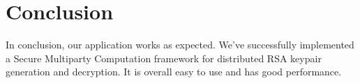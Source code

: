 \chapter{Conclusion}

  In conclusion, our application works as expected. We’ve successfully implemented a Secure  Multiparty Computation framework for distributed RSA keypair generation and decryption. It is overall easy to use and has good performance.
